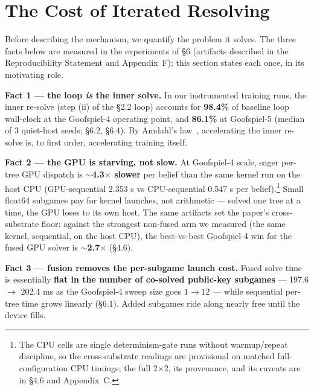 \documentclass[11pt]{article}
\begin{document}
\section{The Cost of Iterated Resolving}

Before describing the mechanism, we quantify the problem it solves. The three facts
below are measured in the experiments of \S6 (artifacts described in the
Reproducibility Statement and Appendix~F); this section states
each once, in its motivating role.

\textbf{Fact 1 --- the loop \emph{is} the inner solve.} In our instrumented training
runs, the inner re-solve (step (ii) of the \S2.2 loop) accounts for \textbf{98.4\%} of
baseline loop wall-clock at the Goofspiel-4 operating point, and \textbf{86.1\%} at
Goofspiel-5 (median of 3 quiet-host seeds; \S6.2, \S6.4). By Amdahl's
law~\citep{Amdahl1967}, accelerating the inner re-solve is, to first order, accelerating
training itself.

\textbf{Fact 2 --- the GPU is starving, not slow.} At Goofspiel-4 scale, eager per-tree
GPU dispatch is $\sim$\textbf{4.3$\times$ slower} per belief than the same kernel run on
the host CPU (GPU-sequential 2.353 s vs CPU-sequential 0.547 s per
belief).\footnote{The CPU cells are single determinism-gate runs without warmup/repeat
discipline, so the cross-substrate readings are provisional on matched
full-configuration CPU timings; the full 2$\times$2, its provenance, and its caveats are
in \S4.6 and Appendix~C.} Small float64 subgames pay for kernel launches, not arithmetic
--- solved one tree at a time, the GPU loses to its own host. The same artifacts set the
paper's cross-substrate floor: against the strongest non-fused arm we measured (the same
kernel, sequential, on the host CPU), the best-vs-best Goofspiel-4 win for the fused GPU
solver is $\sim$\textbf{2.7$\times$} (\S4.6).

\textbf{Fact 3 --- fusion removes the per-subgame launch cost.} Fused solve time is
essentially \textbf{flat in the number of co-solved public-key subgames} --- 197.6
$\to$ 202.4 ms as the Goofspiel-4 sweep size goes $1 \to 12$ --- while sequential per-tree time
grows linearly (\S6.1). Added subgames ride along nearly free until the device fills.
\end{document}
